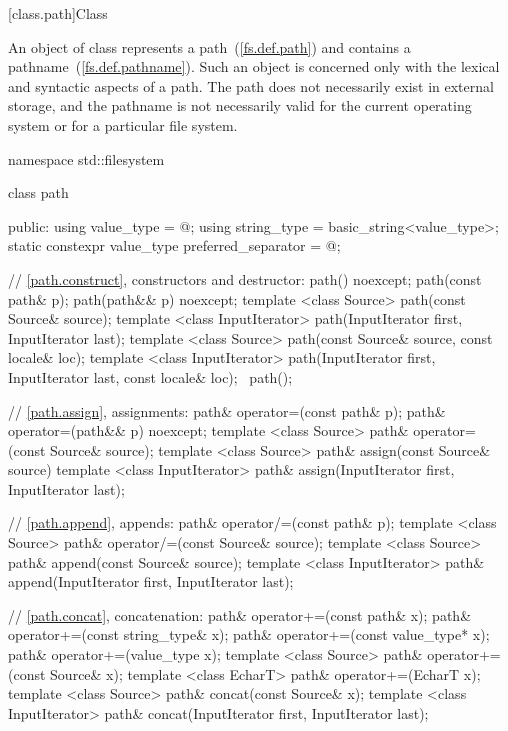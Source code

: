[class.path]{Class }

\pnum
An object of class  represents a path~(\ref{fs.def.path})
and contains a pathname~(\ref{fs.def.pathname}).
Such an object is concerned only with the lexical and syntactic aspects
of a path. The path does not necessarily exist in external storage, and the
pathname is not necessarily valid for the current operating
system or for a particular file system.

\begin{codeblock}
namespace std::filesystem {
  class path {
  public:
    using value_type  = @\seebelow@;
    using string_type = basic_string<value_type>;
    static constexpr value_type preferred_separator = @\seebelow@;

    // \ref{path.construct}, constructors and destructor:
    path() noexcept;
    path(const path& p);
    path(path&& p) noexcept;
    template <class Source>
      path(const Source& source);
    template <class InputIterator>
      path(InputIterator first, InputIterator last);
    template <class Source>
      path(const Source& source, const locale& loc);
    template <class InputIterator>
      path(InputIterator first, InputIterator last, const locale& loc);
   ~path();

    // \ref{path.assign}, assignments:
    path& operator=(const path& p);
    path& operator=(path&& p) noexcept;
    template <class Source>
      path& operator=(const Source& source);
    template <class Source>
      path& assign(const Source& source)
    template <class InputIterator>
      path& assign(InputIterator first, InputIterator last);

    // \ref{path.append}, appends:
    path& operator/=(const path& p);
    template <class Source>
      path& operator/=(const Source& source);
    template <class Source>
      path& append(const Source& source);
    template <class InputIterator>
      path& append(InputIterator first, InputIterator last);

    // \ref{path.concat}, concatenation:
    path& operator+=(const path& x);
    path& operator+=(const string_type& x);
    path& operator+=(const value_type* x);
    path& operator+=(value_type x);
    template <class Source>
      path& operator+=(const Source& x);
    template <class EcharT>
      path& operator+=(EcharT x);
    template <class Source>
      path& concat(const Source& x);
    template <class InputIterator>
      path& concat(InputIterator first, InputIterator last);

}}
\end{codeblock}

